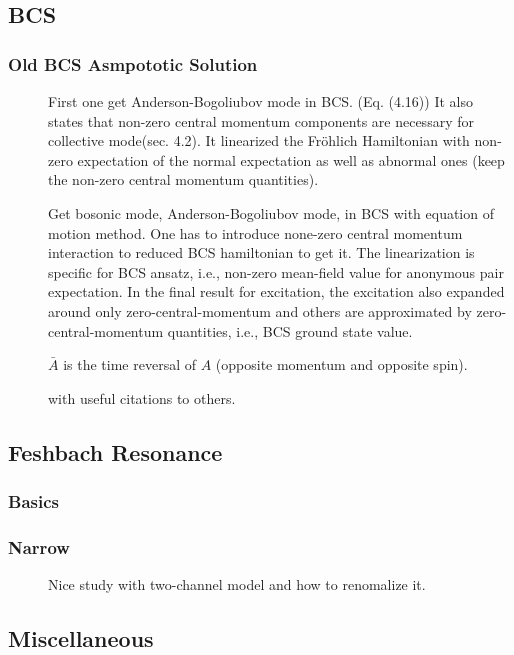\subsection{BCS}
\subsubsection{Old BCS Asmpototic Solution}
\begin{description}
 \item [\cite{BogoliubovColl}] First one get Anderson-Bogoliubov mode in BCS.  (Eq. (4.16))  It also states that non-zero central momentum components are necessary for collective mode(sec. 4.2).  It linearized the Fr\"{o}hlich Hamiltonian with non-zero expectation of the normal expectation as well as abnormal ones (keep the non-zero central momentum quantities). 
  \item [\cite{AndersonBCS}]Get bosonic mode, Anderson-Bogoliubov mode, in BCS with  equation of motion method.  One has to introduce none-zero central momentum interaction to reduced BCS hamiltonian to get it.  The linearization is specific for BCS ansatz, i.e., non-zero mean-field value for anonymous pair expectation. In the final result for excitation, the excitation also expanded around only zero-central-momentum and others are approximated by zero-central-momentum quantities, i.e., BCS ground state value. 
   
   $\bar{A}$ is the time reversal of $A$ (opposite momentum and opposite spin).
	\item[ \cite{BcsExact}] with useful citations to others.         
 \end{description}

\subsection{Feshbach Resonance}
\subsubsection{Basics}
\subsubsection{Narrow}
\begin{description}
  \item [\cite{JacksonNarrow}]Nice study with two-channel model and how to renomalize it. 
	
 \end{description}
\subsection{Miscellaneous}
